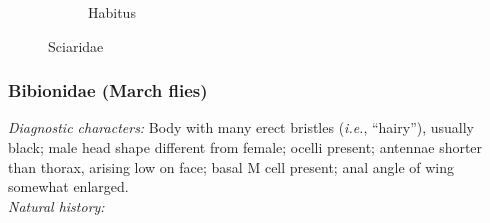 \documentclass[letterpaper, 11pt]{article}
\begin{document}
\begin{figure}[ht!]
\begin{subfigure}[ht!]{0.25\textwidth}
        \caption{Habitus \citep[][Fig. 15.4]{mcalpine1981manual}}
        \label{fig:sciarid2}
    \end{subfigure}
    \caption{Sciaridae}\label{fig:sciarids}
\end{figure}

\subsubsection{Bibionidae (March flies)}
\noindent{}\textit{Diagnostic characters:} Body with many erect bristles (\textit{i.e.}, ``hairy''), usually black; male head shape different from female; ocelli present; antennae shorter than thorax, arising low on face; basal M cell present; anal angle of wing somewhat enlarged.\\

\noindent{}\textit{Natural history:} \\
\end{document}
